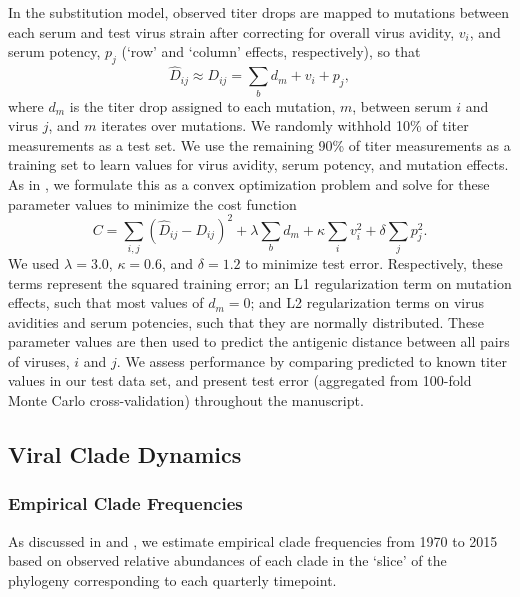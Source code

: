 \documentclass[11pt,oneside,letterpaper]{article}
\begin{document}
In the substitution model, observed titer drops are mapped to mutations between each serum and test virus strain after correcting for overall virus avidity, $v_i$, and serum potency, $p_j$ (`row' and `column' effects, respectively), so that
\begin{equation}
  \label{eq_predicted_titers}
\hat{D}_{ij} \approx D_{ij} = \sum_{b} d_m + v_i + p_j,
\end{equation}
where $d_m$ is the titer drop assigned to each mutation, $m$, between serum $i$ and virus $j$, and $m$ iterates over mutations.
We randomly withhold 10\% of titer measurements as a test set.
We use the remaining 90\% of titer measurements as a training set to learn values for virus avidity, serum potency, and mutation effects.
As in \citet{neher2016prediction}, we formulate this as a convex optimization problem and solve for these parameter values to minimize the cost function
\begin{equation}
  \label{eq_cost_fn}
C = \sum_{i,j} (\hat{D}_{ij} - D_{ij})^2 + \lambda \sum_{b} d_m + \kappa \sum_{i} v_i^2 + \delta \sum_{j} p_j^2.
\end{equation}
We used $\lambda = 3.0$, $\kappa = 0.6$, and $\delta = 1.2$ to minimize test error.
Respectively, these terms represent the squared training error; an L1 regularization term on mutation effects, such that most values of $d_m = 0$; and L2 regularization terms on virus avidities and serum potencies, such that they are normally distributed.
These parameter values are then used to predict the antigenic distance between all pairs of viruses, $i$ and $j$.
We assess performance by comparing predicted to known titer values in our test data set, and present test error (aggregated from 100-fold Monte Carlo cross-validation) throughout the manuscript.

\subsection*{Viral Clade Dynamics}
\subsubsection*{Empirical Clade Frequencies}
As discussed in \citet{neher2016prediction} and \citet{lee2018deep}, we estimate empirical clade frequencies from 1970 to 2015 based on observed relative abundances of each clade in the `slice' of the phylogeny corresponding to each quarterly timepoint.
\end{document}
